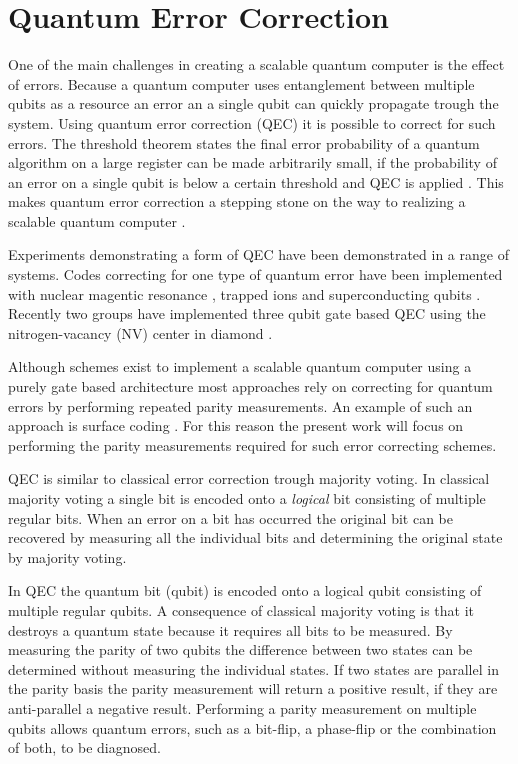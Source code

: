 \section{Quantum Error Correction}
One of the main challenges in creating a scalable quantum computer is the effect of errors.
Because a quantum computer uses entanglement between multiple qubits as a resource an error an a single qubit can quickly propagate trough the system.
Using quantum error correction (QEC) it is possible to correct for such errors.
The threshold theorem states the final error probability of a quantum algorithm on a large register can be made arbitrarily small, if the probability of an error on a single qubit is below a certain threshold and QEC is applied \citep{Mermin1990Extreme}.
This makes quantum error correction a stepping stone on the way to realizing a scalable quantum computer \citep{Nielsen2010Quantum}.

Experiments demonstrating a form of QEC have been demonstrated in a range of systems.
Codes correcting for one type of quantum error have been implemented with nuclear magentic resonance \citep{Cory1998Experimental,Moussa2011Demonstration}, trapped ions \citep{Schindler2011Experimental}  and superconducting qubits \citep{Reed2012Realization}.
Recently two groups have implemented three qubit gate based QEC using the nitrogen-vacancy (NV) center in diamond \citep{Taminiau2014Universal,Waldherr2014Quantum}.

Although schemes exist to implement a scalable quantum computer using a purely gate based architecture most approaches rely on correcting for quantum errors by performing repeated parity measurements. An example of such an approach is surface coding \citep{Fowler2012Surface}.
For this reason the present work will focus on performing the parity measurements required for such error correcting schemes.

QEC is similar to classical error correction trough majority voting.
In classical majority voting a single bit is encoded onto a \emph{logical} bit consisting of multiple regular bits.
When an error on a bit has occurred the original bit can be recovered by measuring all the individual bits and determining the original state by majority voting.

In QEC the quantum bit (qubit) is encoded onto a logical qubit consisting of multiple regular qubits.
A consequence of classical majority voting is that it destroys a quantum state because it requires all bits to be measured.
By measuring the parity of two qubits the difference between two states can be determined without measuring the individual states.
If two states are parallel in the parity basis the parity measurement will return a positive result, if they are anti-parallel a negative result.
Performing a parity measurement on multiple qubits allows quantum errors, such as a bit-flip, a phase-flip or the combination of both, to be diagnosed.

